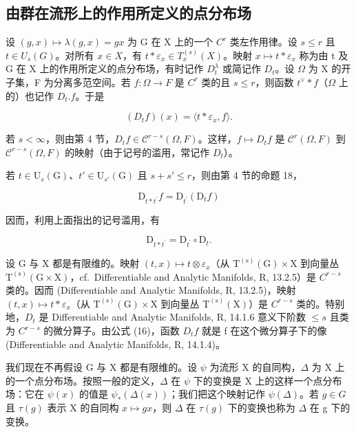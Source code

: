 \subsection{由群在流形上的作用所定义的点分布场}

设 \((g,x)\mapsto\lambda(g,x)=gx\) 为 G 在 X 上的一个 \(C^{r}\) 类左作用律。设 \(s\leqslant r\) 且 \(t\in U_{s}(G)\)。对所有 \(x\in X\)，有 \(t*\varepsilon_{x}\in T_{x}^{(s)}(X)\)。映射 \(x\mapsto t*\varepsilon_{x}\) 称为由 t 及 G 在 X 上的作用所定义的点分布场，有时记作 \(D_{t}^{\lambda}\) 或简记作 \(D_{t}\)。设 \(\Omega\) 为 X 的开子集，F 为分离多范空间。若 \(f\colon\Omega\to F\) 是 \(C^{r}\) 类的且 \(s\leqslant r\)，则函数 \(t^{\vee}\ast f\)（\(\Omega\) 上的）也记作 \(D_{t}.f\)。于是

\[
(D _ {t} f) (x) = \langle t * \varepsilon_ {x}, f \rangle .\tag{16}
\]

若 \(s < \infty\)，则由第 4 节，\(D_t f \in \mathcal{C}^{r-s}(\Omega, F)\)。这样，\(f \mapsto D_t f\) 是 \(\mathcal{C}^r(\Omega, F)\) 到 \(\mathcal{C}^{r-s}(\Omega, F)\) 的映射（由于记号的滥用，常记作 \(D_t\)）。

若 \(t \in \mathrm{U}_s(\mathrm{G})\)、\(t' \in \mathrm{U}_{s'}(\mathrm{G})\) 且 \(s + s' \leqslant r\)，则由第 4 节的命题 18，

\[
\mathrm{D} _ {t * t ^ {\prime}} f = \mathrm{D} _ {t ^ {\prime}} (\mathrm{D} _ {t} f)\tag{17}
\]

因而，利用上面指出的记号滥用，有

\[
\mathrm{D} _ {t * t ^ {\prime}} = \mathrm{D} _ {t ^ {\prime}} \circ \mathrm{D} _ {t}.\tag{18}
\]

设 G 与 X 都是有限维的。映射 \((t, x) \mapsto t \otimes \varepsilon_{x}\)（从 \(\mathrm{T}^{(\mathrm{s})}(\mathrm{G}) \times \mathrm{X}\) 到向量丛 \(\mathrm{T}^{(\mathrm{s})}(\mathrm{G} \times \mathrm{X})\)，cf.~Differentiable and Analytic Manifolds, R, 13.2.5）是 \(C^{r-s}\) 类的。因而 (Differentiable and Analytic Manifolds, R, 13.2.5)，映射 \((t, x) \mapsto t * \varepsilon_{x}\)（从 \(\mathrm{T}^{(\mathrm{s})}(\mathrm{G}) \times \mathrm{X}\) 到向量丛 \(\mathrm{T}^{(\mathrm{s})}(\mathrm{X})\)）是 \(C^{r-s}\) 类的。特别地，\(D_{t}\) 是 Differentiable and Analytic Manifolds, R, 14.1.6 意义下阶数 \(\leqslant s\) 且类为 \(C^{r-s}\) 的微分算子。由公式 (16)，函数 \(D_{t}f\) 就是 f 在这个微分算子下的像 (Differentiable and Analytic Manifolds, R, 14.1.4)。

我们现在不再假设 G 与 X 都是有限维的。设 \(\psi\) 为流形 X 的自同构，\(\Delta\) 为 X 上的一个点分布场。按照一般的定义，\(\Delta\) 在 \(\psi\) 下的变换是 X 上的这样一个点分布场：它在 \(\psi(x)\) 的值是 \(\psi_{*}(\Delta(x))\)；我们把这个映射记作 \(\psi(\Delta)\)。若 \(g \in G\) 且 \(\tau(g)\) 表示 X 的自同构 \(x \mapsto gx\)，则 \(\Delta\) 在 \(\tau(g)\) 下的变换也称为 \(\Delta\) 在 g 下的变换。


